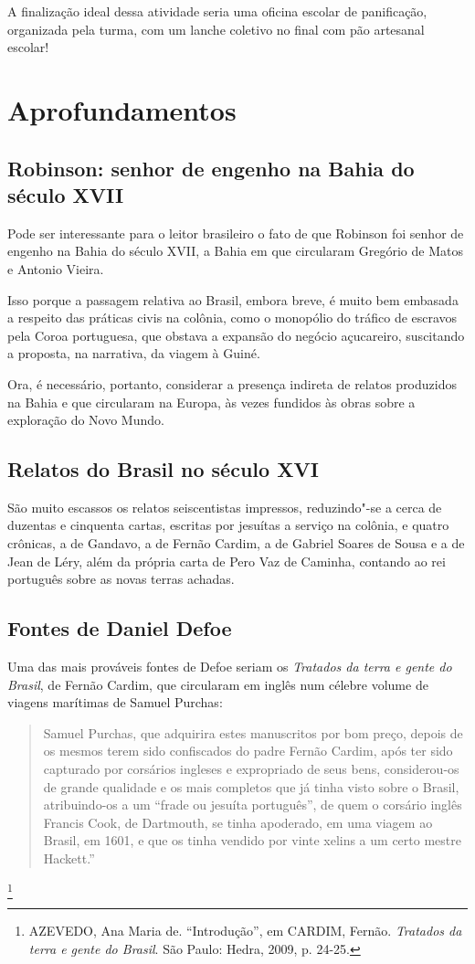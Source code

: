 \documentclass[12pt]{extarticle}
\begin{document}
A finalização ideal dessa atividade seria uma oficina escolar de
panificação, organizada pela turma, com um lanche coletivo no final com
pão artesanal escolar!

\section{Aprofundamentos}

\subsection{Robinson: senhor de engenho na Bahia do século XVII}

Pode ser interessante para o leitor brasileiro o fato de que Robinson
foi senhor de engenho na Bahia do século XVII, a Bahia em que circularam
Gregório de Matos e Antonio Vieira.

Isso porque a passagem relativa ao Brasil, embora breve, é muito bem
embasada a respeito das práticas civis na colônia, como o monopólio do
tráfico de escravos pela Coroa portuguesa, que obstava a expansão do
negócio açucareiro, suscitando a proposta, na narrativa, da viagem à
Guiné.

Ora, é necessário, portanto, considerar a presença indireta de relatos
produzidos na Bahia e que circularam na Europa, às vezes fundidos às
obras sobre a exploração do Novo Mundo.

\subsection{Relatos do Brasil no século XVI}

São muito escassos os relatos seiscentistas impressos, reduzindo"-se a
cerca de duzentas e cinquenta cartas, escritas por jesuítas a serviço na
colônia, e quatro crônicas, a de Gandavo, a de Fernão Cardim, a de
Gabriel Soares de Sousa e a de Jean de Léry, além da própria carta de
Pero Vaz de Caminha, contando ao rei português sobre as novas terras
achadas.

\subsection{Fontes de Daniel Defoe}

Uma das mais prováveis fontes de Defoe seriam os \emph{Tratados da terra
e gente do Brasil}, de Fernão Cardim, que circularam em inglês num
célebre volume de viagens marítimas de Samuel Purchas:

\begin{quote} Samuel Purchas, que adquirira estes manuscritos por bom preço, depois
de os mesmos terem sido confiscados do padre Fernão Cardim, após ter
sido capturado por corsários ingleses e expropriado de seus bens,
considerou-os de grande qualidade e os mais completos que já tinha visto
sobre o Brasil, atribuindo-os a um ``frade ou jesuíta português'', de
quem o corsário inglês Francis Cook, de Dartmouth, se tinha apoderado,
em uma viagem ao Brasil, em 1601, e que os tinha vendido por vinte
xelins a um certo mestre Hackett.''\end{quote}\footnote{AZEVEDO, Ana Maria de.
  ``Introdução'', em CARDIM, Fernão. \emph{Tratados da terra e gente do
  Brasil}. São Paulo: Hedra, 2009, p. 24-25.}
\end{document}
